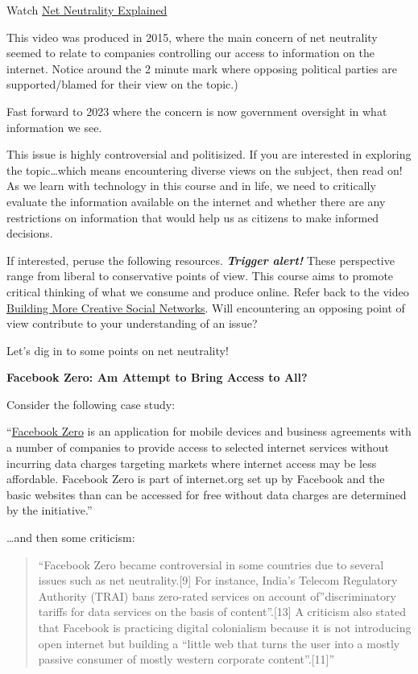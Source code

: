 \documentclass[
]{book}
\theoremstyle{definition}
\theoremstyle{definition}
\theoremstyle{definition}
\theoremstyle{definition}
\theoremstyle{remark}
\begin{document}
\begin{reflect}
Watch \href{https://www.youtube.com/watch?v=p90McT24Z6w}{Net Neutrality Explained}

This video was produced in 2015, where the main concern of net neutrality seemed to relate to companies controlling our access to information on the internet. Notice around the 2 minute mark where opposing political parties are supported/blamed for their view on the topic.)

Fast forward to 2023 where the concern is now government oversight in what information we see.

This issue is highly controversial and politisized. If you are interested in exploring the topic\ldots which means encountering diverse views on the subject, then read on! As we learn with technology in this course and in life, we need to critically evaluate the information available on the internet and whether there are any restrictions on information that would help us as citizens to make informed decisions.

If interested, peruse the following resources. \textbf{\emph{Trigger alert!}} These perspective range from liberal to conservative points of view. This course aims to promote critical thinking of what we consume and produce online. Refer back to the video \href{https://www.youtube.com/watch?v=Acc4zY1sQ0o}{Building More Creative Social Networks}. Will encountering an opposing point of view contribute to your understanding of an issue?

Let's dig in to some points on net neutrality!

\textbf{Facebook Zero: Am Attempt to Bring Access to All?}

Consider the following case study:

``\href{https://en.wikipedia.org/wiki/Facebook_Zero}{Facebook Zero} is an application for mobile devices and business agreements with a number of companies to provide access to selected internet services without incurring data charges targeting markets where internet access may be less affordable. Facebook Zero is part of internet.org set up by Facebook and the basic websites than can be accessed for free without data charges are determined by the initiative.''

\ldots and then some criticism:

\begin{quote}
``Facebook Zero became controversial in some countries due to several issues such as net neutrality.{[}9{]} For instance, India's Telecom Regulatory Authority (TRAI) bans zero-rated services on account of''discriminatory tariffs for data services on the basis of content''.{[}13{]} A criticism also stated that Facebook is practicing digital colonialism because it is not introducing open internet but building a ``little web that turns the user into a mostly passive consumer of mostly western corporate content''.{[}11{]}''
\end{quote}


\end{reflect}
\end{document}
